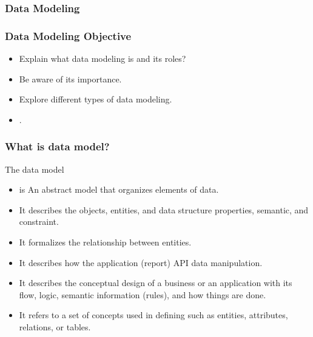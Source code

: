 
\subsubsection{Data Modeling}


\begin{frame}
    \frametitle{Data Modeling Objective}
    \begin{itemize}[<+->]
        \item Explain what data modeling is and its roles?
        \item Be aware of its importance.
        \item Explore different types of data modeling.
        \item {}.
    \end{itemize}

\end{frame}


\begin{frame}
    \frametitle{What is data model?}
	The data model
    \begin{itemize}[<+->]
        \item is An abstract model that organizes elements of data.
        \item It describes the objects, entities, and data structure properties, semantic, and constraint.
        \item It formalizes the relationship between entities.
        \item It describes how the application (report) API data manipulation.
        \item It describes the conceptual design of a business or an application with its flow, logic, semantic information (rules), and how things are done.
        \item It refers to a set of concepts used in defining such as entities, attributes, relations, or tables.
    \end{itemize}
\end{frame}

